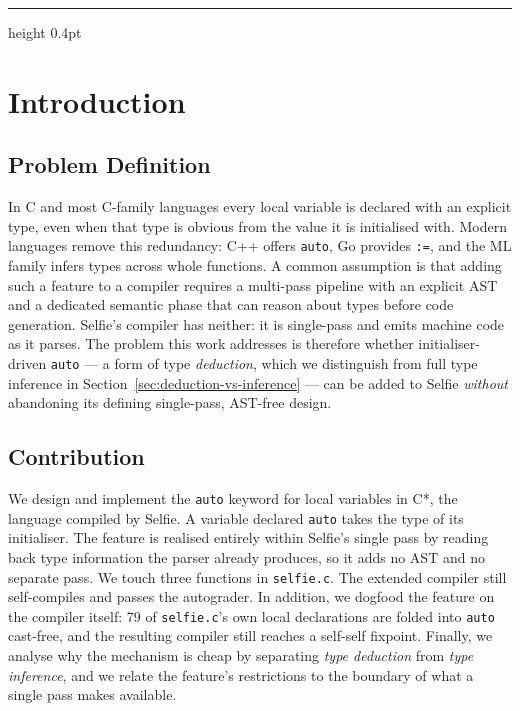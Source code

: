 \documentclass[a4paper,11pt]{article}
\begin{document}
\hrule height 0.4pt
\vspace{0.3cm}

\section{Introduction}
\label{sec:introduction}

\subsection{Problem Definition}
\label{sec:problem}

In C and most C-family languages every local variable is declared with an explicit type, even when that type is obvious from the value it is initialised with. Modern languages remove this redundancy: C++ offers \texttt{auto}, Go provides \texttt{:=}, and the ML family infers types across whole functions. A common assumption is that adding such a feature to a compiler requires a multi-pass pipeline with an explicit AST and a dedicated semantic phase that can reason about types before code generation. Selfie's compiler has neither: it is single-pass and emits machine code as it parses. The problem this work addresses is therefore whether initialiser-driven \texttt{auto} --- a form of type \emph{deduction}, which we distinguish from full type inference in Section~\ref{sec:deduction-vs-inference} --- can be added to Selfie \emph{without} abandoning its defining single-pass, AST-free design.

\subsection{Contribution}
\label{sec:contribution}

We design and implement the \texttt{auto} keyword for local variables in C*, the language compiled by Selfie. A variable declared \texttt{auto} takes the type of its initialiser. The feature is realised entirely within Selfie's single pass by reading back type information the parser already produces, so it adds no AST and no separate pass. We touch three functions in \texttt{selfie.c}. The extended compiler still self-compiles and passes the autograder. In addition, we dogfood the feature on the compiler itself: 79 of \texttt{selfie.c}'s own local declarations are folded into \texttt{auto} cast-free, and the resulting compiler still reaches a self-self fixpoint. Finally, we analyse why the mechanism is cheap by separating \emph{type deduction} from \emph{type inference}, and we relate the feature's restrictions to the boundary of what a single pass makes available.
\end{document}
